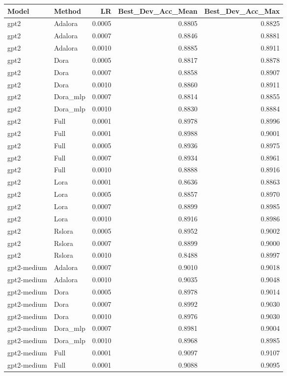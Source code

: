 \begin{tabular}{llrrr}
\toprule
Model & Method & LR & Best_Dev_Acc_Mean & Best_Dev_Acc_Max \\
\midrule
gpt2 & Adalora & 0.0005 & 0.8805 & 0.8825 \\
gpt2 & Adalora & 0.0007 & 0.8846 & 0.8881 \\
gpt2 & Adalora & 0.0010 & 0.8885 & 0.8911 \\
gpt2 & Dora & 0.0005 & 0.8817 & 0.8878 \\
gpt2 & Dora & 0.0007 & 0.8858 & 0.8907 \\
gpt2 & Dora & 0.0010 & 0.8860 & 0.8911 \\
gpt2 & Dora_mlp & 0.0007 & 0.8814 & 0.8855 \\
gpt2 & Dora_mlp & 0.0010 & 0.8830 & 0.8884 \\
gpt2 & Full & 0.0001 & 0.8978 & 0.8996 \\
gpt2 & Full & 0.0001 & 0.8988 & 0.9001 \\
gpt2 & Full & 0.0005 & 0.8936 & 0.8975 \\
gpt2 & Full & 0.0007 & 0.8934 & 0.8961 \\
gpt2 & Full & 0.0010 & 0.8888 & 0.8916 \\
gpt2 & Lora & 0.0001 & 0.8636 & 0.8863 \\
gpt2 & Lora & 0.0005 & 0.8857 & 0.8970 \\
gpt2 & Lora & 0.0007 & 0.8899 & 0.8985 \\
gpt2 & Lora & 0.0010 & 0.8916 & 0.8986 \\
gpt2 & Rslora & 0.0005 & 0.8952 & 0.9002 \\
gpt2 & Rslora & 0.0007 & 0.8899 & 0.9000 \\
gpt2 & Rslora & 0.0010 & 0.8488 & 0.8997 \\
gpt2-medium & Adalora & 0.0007 & 0.9010 & 0.9018 \\
gpt2-medium & Adalora & 0.0010 & 0.9035 & 0.9048 \\
gpt2-medium & Dora & 0.0005 & 0.8978 & 0.9014 \\
gpt2-medium & Dora & 0.0007 & 0.8992 & 0.9030 \\
gpt2-medium & Dora & 0.0010 & 0.8976 & 0.9030 \\
gpt2-medium & Dora_mlp & 0.0007 & 0.8981 & 0.9004 \\
gpt2-medium & Dora_mlp & 0.0010 & 0.8968 & 0.8985 \\
gpt2-medium & Full & 0.0001 & 0.9097 & 0.9107 \\
gpt2-medium & Full & 0.0001 & 0.9088 & 0.9095 \\

\end{tabular}
